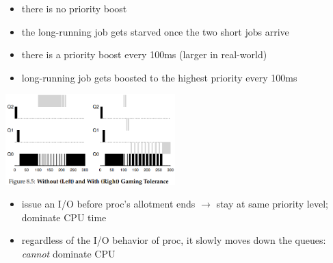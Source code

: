 \documentclass[8pt,a4paper,landscape]{extarticle}
\begin{document}
\begin{multicols*}{3}
\begin{minipage}{.5\linewidth}
  \flushleft
  \begin{itemize}
  \item there is no priority boost
  \item the long-running job gets starved once the two short jobs arrive
  \end{itemize}
\end{minipage}
\begin{minipage}{.5\linewidth}
  \flushleft
  \begin{itemize}
  \item there is a priority boost every 100ms (larger in real-world)
  \item long-running job gets boosted to the highest priority every 100ms
  \end{itemize}
\end{minipage}
\includegraphics[width=\linewidth,height=3.5cm]{imgs/sched_g}
\begin{minipage}{.5\linewidth}
  \flushleft
  \begin{itemize}
  \item issue an I/O before proc's allotment ends $\to$ stay at same priority level; dominate CPU time
  \end{itemize}
\end{minipage}
\begin{minipage}{.5\linewidth}
  \flushleft
  \begin{itemize}
  \item regardless of the I/O behavior of proc, it slowly moves down the queues: \emph{cannot} dominate CPU
  \end{itemize}
\end{minipage}

\end{multicols*}
\end{document}
